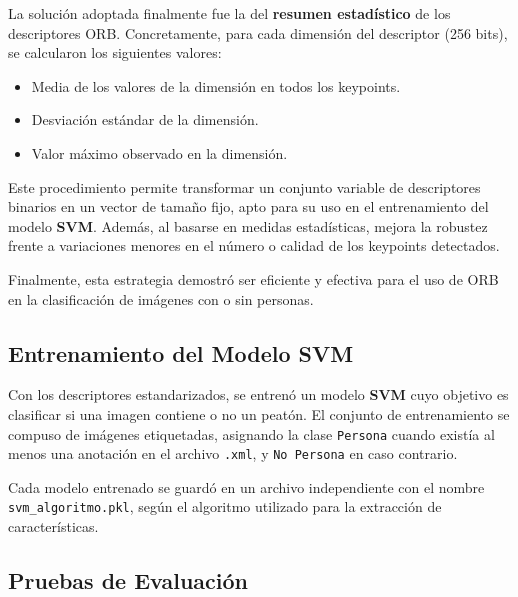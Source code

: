 \documentclass[a4paper]{article}
\begin{document}
\par\vspace{0.5cm}
La solución adoptada finalmente fue la del \textbf{resumen estadístico} de los descriptores ORB.  
Concretamente, para cada dimensión del descriptor (256 bits), se calcularon los siguientes valores:
\begin{itemize}
    \item Media de los valores de la dimensión en todos los keypoints.
    \item Desviación estándar de la dimensión.
    \item Valor máximo observado en la dimensión.
\end{itemize}

\par\vspace{0.5cm}
Este procedimiento permite transformar un conjunto variable de descriptores binarios en un vector de tamaño fijo, apto para su uso en el entrenamiento del modelo \textbf{SVM}.  
Además, al basarse en medidas estadísticas, mejora la robustez frente a variaciones menores en el número o calidad de los keypoints detectados.

\par\vspace{0.5cm}
Finalmente, esta estrategia demostró ser eficiente y efectiva para el uso de ORB en la clasificación de imágenes con o sin personas.




\subsection{Entrenamiento del Modelo SVM}

Con los descriptores estandarizados, se entrenó un modelo \textbf{SVM} cuyo objetivo es clasificar si una imagen contiene o no un peatón. El conjunto de entrenamiento se compuso de imágenes etiquetadas, asignando la clase \texttt{Persona} cuando existía al menos una anotación en el archivo \texttt{.xml}, y \texttt{No Persona} en caso contrario.

\par\vspace{0.5cm}

Cada modelo entrenado se guardó en un archivo independiente con el nombre \texttt{svm\_algoritmo.pkl}, según el algoritmo utilizado para la extracción de características.

\subsection{Pruebas de Evaluación}
\end{document}
